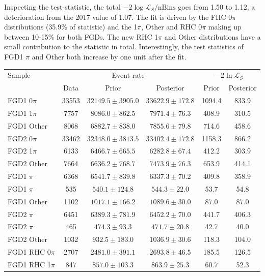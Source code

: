 Inspecting the test-statistic, the total $-2\log\mathcal{L}_S/\text{nBins}$ goes from 1.50 to 1.12, a deterioration from the 2017 value of 1.07. The fit is driven by the FHC 0$\pi$ distributions (35.9\% of statistic) and the 1$\pi$, Other and RHC 0$\pi$ making up between 10-15\% for both FGDs. The new RHC 1$\pi$ and Other distributions have a small contribution to the statistic in total. Interestingly, the test statistics of FGD1 $\pi$ and Other both increase by one unit after the fit.
\begin{table}
	\centering
	\begin{tabular}{ l | c c c | c c }
		\hline
		\hline
		Sample 			& \multicolumn{3}{c|}{Event rate} & \multicolumn{2}{c}{$-2\ln\mathcal{L}_S$} \\
		& Data	& Prior & Posterior & Prior & Posterior \\
		\hline
		FGD1 0$\pi$ 	& 33553	& $32149.5\pm3905.0$ 	& $33622.9\pm172.8$ & 1094.4  & 833.9 	\\ 
		FGD1 1$\pi$ 	& 7757 	& $8086.0\pm862.5$	& $7971.4\pm76.3$  & 408.9  & 310.5 	\\ 
		FGD1 Other 		& 8068 	& $6882.7\pm838.0$	& $7855.6\pm79.8$  & 714.6  & 458.6 	\\ 
		\hline
		FGD2 0$\pi$ 	& 33462 & $32348.0\pm3813.5$	& $33402.4\pm172.8$ & 1158.3  & 866.2 	\\ 
		FGD2 1$\pi$ 	& 6133 	& $6466.7\pm665.5$	& $6282.8\pm67.4$  & 412.2 & 303.9 	\\ 
		FGD2 Other 		& 7664 	& $6636.2\pm768.7$	& $7473.9\pm76.3$  & 653.9  & 414.1 	\\ 
		\hline
		FGD1 \numubar 0$\pi$ 	& 6368 	& $6541.7\pm839.8$	& $6337.3\pm70.2$  & 409.8  & 358.9 	\\ 
		FGD1 \numubar 1$\pi$ 	& 535 	& $540.1\pm124.8$	& $544.3\pm22.0$  & 53.7  & 54.8 	\\ 
		FGD1 \numubar Other 	& 1102 	& $1017.1\pm166.2$	& $1089.6\pm30.0$  & 87.0  &  87.0	\\ 
		\hline
		FGD2 \numubar 0$\pi$ 	& 6451  & $6389.3\pm781.9$	& $6452.2\pm70.0$ & 441.7  & 406.3	\\ 
		FGD2 \numubar 1$\pi$ 	& 465 	& $474.3\pm93.3$	& $471.7\pm20.8$  & 42.7 & 40.0 	\\ 
		FGD2 \numubar Other 	& 1032 	& $932.5\pm183.0$	& $1036.9\pm30.6$  & 118.3  & 104.0 	\\ 
		\hline
		FGD1 \numu RHC 0$\pi$ 	& 2707 	& $2481.0\pm391.1$	& $2693.8\pm46.5$  & 185.5  & 126.5 	\\ 
		FGD1 \numu RHC 1$\pi$ 	& 847 	& $857.0\pm103.3$	& $863.9\pm25.3$  & 60.7  & 52.3 	\\ 

\end{tabular}
\end{table}

